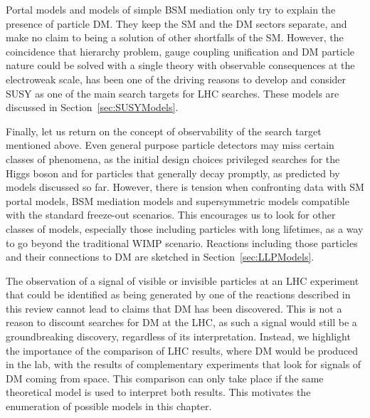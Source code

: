 Portal models and models of simple BSM mediation only try to explain the presence of particle DM. They keep the SM and the DM sectors separate, and make no claim to being a solution of other shortfalls of the SM. However, the coincidence that hierarchy problem, gauge coupling unification and DM particle nature could be solved with a single theory with observable consequences at the electroweak scale, has been one of the driving reasons to develop and consider SUSY as one of the main search targets for LHC searches. These models are discussed in Section~\ref{sec:SUSYModels}.

Finally, let us return on the concept of observability of the search target mentioned above. Even general purpose particle detectors may miss certain classes of phenomena, as the initial design choices privileged searches for the Higgs boson and for particles that generally decay promptly, as predicted by models discussed so far. However, there is tension when confronting data with SM portal models, BSM mediation models and supersymmetric models compatible with the standard freeze-out scenarios. This encourages us to look for other classes of models, especially those including particles with long lifetimes, as a way to go beyond the traditional WIMP scenario. Reactions including those particles and their connections to DM are sketched in Section~\ref{sec:LLPModels}.

The observation of a signal of visible or invisible particles at an LHC experiment that could be identified as being generated by one of the reactions described in this review cannot lead to claims that DM has been discovered. This is not a reason to discount searches for DM at the LHC, as such a signal would still be a groundbreaking discovery, regardless of its interpretation. Instead, we highlight the importance of the comparison of LHC results, where DM would be produced in the lab, with the results of complementary experiments that look for signals of DM coming from space. This comparison can only take place if the same theoretical model is used to interpret both results. This motivates the enumeration of possible models in this chapter. 
